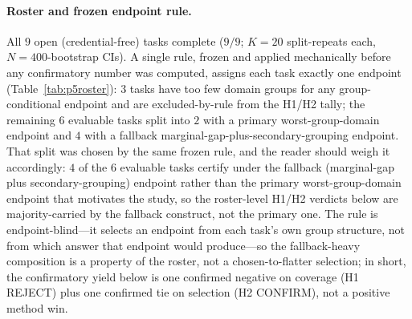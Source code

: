 \documentclass[pdflatex,sn-mathphys-num]{sn-jnl}
\begin{document}
\paragraph{Roster and frozen endpoint rule.} All $9$ open (credential-free) tasks complete ($9/9$;
$K{=}20$ split-repeats each, $N{=}400$-bootstrap CIs). A single rule, frozen and applied mechanically before
any confirmatory number was computed, assigns each task exactly one endpoint (Table~\ref{tab:p5roster}):
$3$ tasks have too few domain groups for any group-conditional endpoint and are excluded-by-rule from the
H1/H2 tally; the remaining $6$ evaluable tasks split into $2$ with a primary worst-group-domain endpoint and
$4$ with a fallback marginal-gap-plus-secondary-grouping endpoint. That split was chosen by the same
frozen rule, and the reader should weigh it accordingly:
$4$ of the $6$ evaluable tasks certify under the fallback (marginal-gap plus secondary-grouping) endpoint
rather than the primary worst-group-domain endpoint that motivates the study, so the roster-level H1/H2
verdicts below are majority-carried by the fallback construct, not the primary one. The rule is
endpoint-blind---it selects an
endpoint from each task's own group structure, not from which answer that endpoint would produce---so the
fallback-heavy composition is a property of the roster, not a chosen-to-flatter selection; in short, the
confirmatory yield below is one confirmed negative on coverage (H1 REJECT) plus one confirmed tie on
selection (H2 CONFIRM), not a positive method win.
\end{document}
